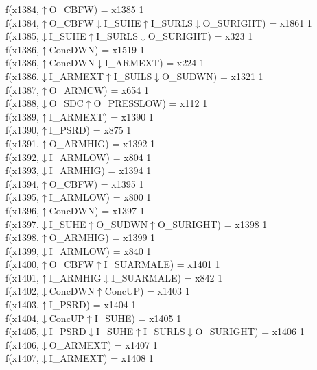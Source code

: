 f(x1384,$\uparrow$O\_CBFW) = x1385 {1} \\
f(x1384,$\uparrow$O\_CBFW$\downarrow$I\_SUHE$\uparrow$I\_SURLS$\downarrow$O\_SURIGHT) = x1861 {1} \\
f(x1385,$\downarrow$I\_SUHE$\uparrow$I\_SURLS$\downarrow$O\_SURIGHT) = x323 {1} \\
f(x1386,$\uparrow$ConcDWN) = x1519 {1} \\
f(x1386,$\uparrow$ConcDWN$\downarrow$I\_ARMEXT) = x224 {1} \\
f(x1386,$\downarrow$I\_ARMEXT$\uparrow$I\_SUILS$\downarrow$O\_SUDWN) = x1321 {1} \\
f(x1387,$\uparrow$O\_ARMCW) = x654 {1} \\
f(x1388,$\downarrow$O\_SDC$\uparrow$O\_PRESSLOW) = x112 {1} \\
f(x1389,$\uparrow$I\_ARMEXT) = x1390 {1} \\
f(x1390,$\uparrow$I\_PSRD) = x875 {1} \\
f(x1391,$\uparrow$O\_ARMHIG) = x1392 {1} \\
f(x1392,$\downarrow$I\_ARMLOW) = x804 {1} \\
f(x1393,$\downarrow$I\_ARMHIG) = x1394 {1} \\
f(x1394,$\uparrow$O\_CBFW) = x1395 {1} \\
f(x1395,$\uparrow$I\_ARMLOW) = x800 {1} \\
f(x1396,$\uparrow$ConcDWN) = x1397 {1} \\
f(x1397,$\downarrow$I\_SUHE$\uparrow$O\_SUDWN$\uparrow$O\_SURIGHT) = x1398 {1} \\
f(x1398,$\uparrow$O\_ARMHIG) = x1399 {1} \\
f(x1399,$\downarrow$I\_ARMLOW) = x840 {1} \\
f(x1400,$\uparrow$O\_CBFW$\uparrow$I\_SUARMALE) = x1401 {1} \\
f(x1401,$\uparrow$I\_ARMHIG$\downarrow$I\_SUARMALE) = x842 {1} \\
f(x1402,$\downarrow$ConcDWN$\uparrow$ConcUP) = x1403 {1} \\
f(x1403,$\uparrow$I\_PSRD) = x1404 {1} \\
f(x1404,$\downarrow$ConcUP$\uparrow$I\_SUHE) = x1405 {1} \\
f(x1405,$\downarrow$I\_PSRD$\downarrow$I\_SUHE$\uparrow$I\_SURLS$\downarrow$O\_SURIGHT) = x1406 {1} \\
f(x1406,$\downarrow$O\_ARMEXT) = x1407 {1} \\
f(x1407,$\downarrow$I\_ARMEXT) = x1408 {1} \\

